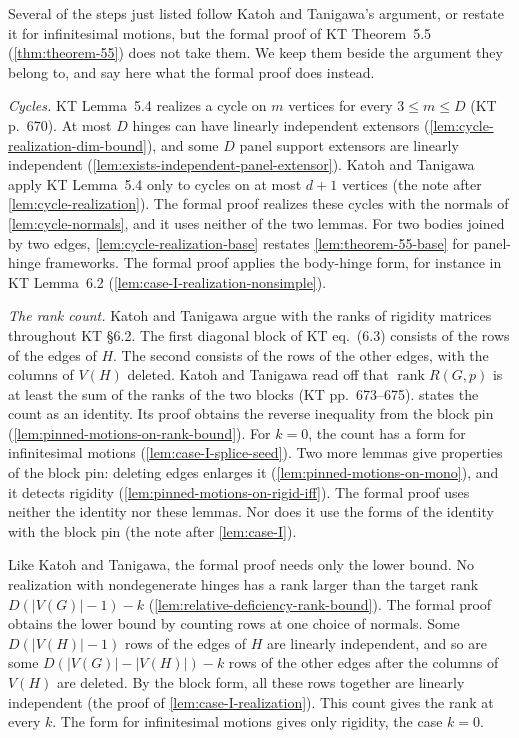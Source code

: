 \begin{remark}
  \label{rem:case-I-kt-steps}
  Several of the steps just listed follow Katoh and Tanigawa's argument,
  or restate it for infinitesimal motions, but the formal proof of KT
  Theorem~5.5 (\cref{thm:theorem-55}) does not take them. We keep them
  beside the argument they belong to, and say here what the formal proof
  does instead.

  \emph{Cycles.} KT Lemma~5.4 realizes a cycle on $m$ vertices for
  every $3 \le m \le D$ (KT p.~670). At most $D$ hinges can have
  linearly independent extensors
  (\cref{lem:cycle-realization-dim-bound}), and some $D$ panel support
  extensors are linearly independent
  (\cref{lem:exists-independent-panel-extensor}). Katoh and Tanigawa
  apply KT Lemma~5.4 only to cycles on at most $d + 1$ vertices (the
  note after \cref{lem:cycle-realization}). The formal proof realizes these
  cycles with the normals of \cref{lem:cycle-normals}, and it uses
  neither of the two lemmas. For two bodies joined by two edges,
  \cref{lem:cycle-realization-base} restates \cref{lem:theorem-55-base}
  for panel-hinge frameworks. The formal proof applies the body-hinge
  form, for instance in KT Lemma~6.2
  (\cref{lem:case-I-realization-nonsimple}).

  \emph{The rank count.} Katoh and Tanigawa argue with the ranks of
  rigidity matrices throughout KT \S6.2. The first diagonal block of
  KT eq.~(6.3) consists of the rows of the edges of $H$. The second
  consists of the rows of the other edges, with the columns of $V(H)$
  deleted. Katoh and Tanigawa read off that $\operatorname{rank} R(G,p)$
  is at least the sum of the ranks of the two blocks (KT
  pp.~673--675).  states the count as an identity. Its
  proof obtains the reverse inequality from the block pin
  (\cref{lem:pinned-motions-on-rank-bound}). For $k = 0$, the count has
  a form for infinitesimal motions (\cref{lem:case-I-splice-seed}). Two
  more lemmas give properties of the block pin: deleting edges enlarges
  it (\cref{lem:pinned-motions-on-mono}), and it detects rigidity
  (\cref{lem:pinned-motions-on-rigid-iff}). The formal proof uses
  neither the identity nor these lemmas. Nor does it use the forms of
  the identity with the block pin (the note after \cref{lem:case-I}).

  Like Katoh and Tanigawa, the formal proof needs only the lower bound.
  No realization with nondegenerate hinges has a rank larger than the
  target rank $D(|V(G)| - 1) - k$
  (\cref{lem:relative-deficiency-rank-bound}). The formal proof obtains
  the lower bound by counting rows at one choice of normals. Some
  $D(|V(H)| - 1)$ rows of the edges of $H$ are linearly independent, and
  so are some $D(|V(G)| - |V(H)|) - k$ rows of the other edges after the
  columns of $V(H)$ are deleted. By the block form, all these rows
  together are linearly independent (the proof of
  \cref{lem:case-I-realization}). This count gives the rank at every
  $k$. The form for infinitesimal motions gives only rigidity, the case
  $k = 0$.


\end{remark}
